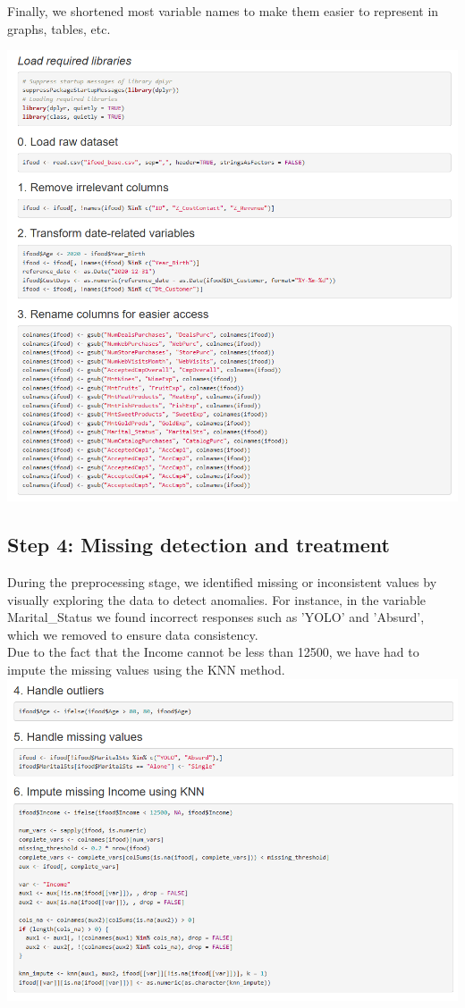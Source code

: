 \documentclass[12pt,a4paper]{article}
\begin{document}
Finally, we shortened most variable names to make them easier to represent in graphs, tables, etc.

\includegraphics[width=\textwidth]{Imatges/pre1.png}

\subsection{Step 4: Missing detection and treatment}
During the preprocessing stage, we identified missing or inconsistent values by visually exploring the data to detect anomalies. For instance, in the variable Marital\_Status we found incorrect responses such as 'YOLO' and 'Absurd', which we removed to ensure data consistency.\\

Due to the fact that the Income cannot be less than 12500, we have had to impute the missing values using the KNN method.\\

\includegraphics[width=\textwidth]{Imatges/pre2.png}
\end{document}
